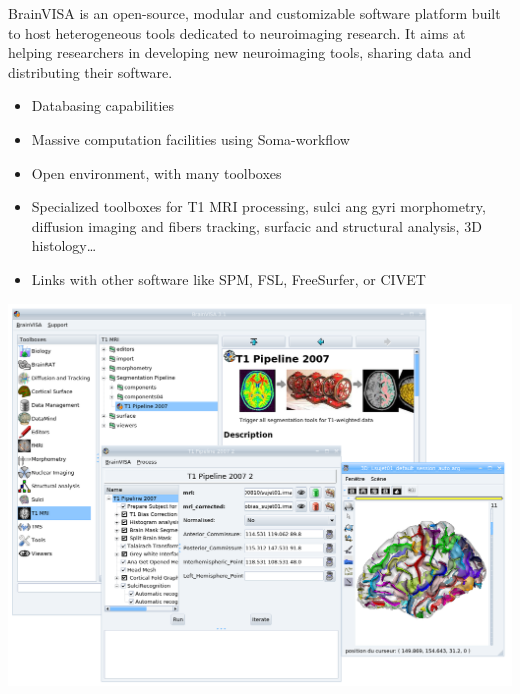 \begin{multicols}{3}

%



BrainVISA is an open-source, modular and customizable software platform built
to host heterogeneous tools dedicated to neuroimaging research. It aims at
helping researchers in developing new neuroimaging tools, sharing data and
distributing their software.
\begin{itemize}[nolistsep,topsep=0em,leftmargin=1pc]
\item Databasing capabilities
\item Massive computation facilities using Soma-workflow
\item Open environment, with many toolboxes
\item Specialized toolboxes for T1 MRI processing, sulci ang gyri morphometry,
diffusion imaging and fibers tracking, surfacic and structural analysis,
3D histology\ldots
\item Links with other software like SPM, FSL, FreeSurfer, or CIVET
\end{itemize}
\includegraphics[width=\columnwidth]{../pics/brainvisa_screenshot.png}


\end{multicols}
